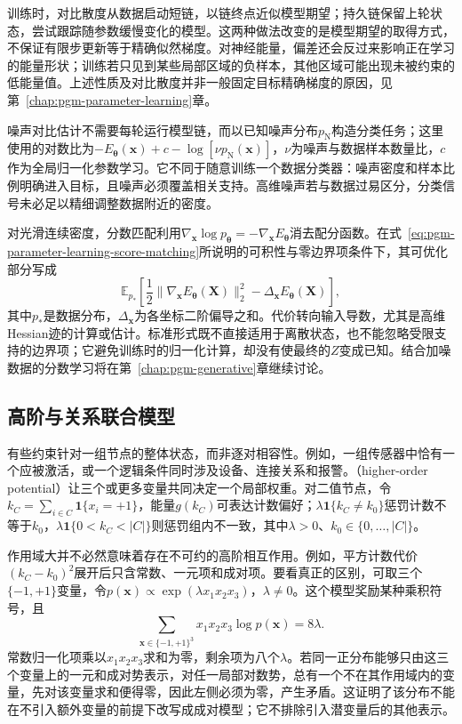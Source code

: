 训练时，对比散度从数据启动短链，以链终点近似模型期望；持久链保留上轮状态，尝试跟踪随参数缓慢变化的模型。这两种做法改变的是模型期望的取得方式，不保证有限步更新等于精确似然梯度。对神经能量，偏差还会反过来影响正在学习的能量形状；训练若只见到某些局部区域的负样本，其他区域可能出现未被约束的低能量值。上述性质及对比散度并非一般固定目标精确梯度的原因，见第~\ref{chap:pgm-parameter-learning}章。

噪声对比估计不需要每轮运行模型链，而以已知噪声分布$p_{\mathrm{N}}$构造分类任务；这里使用的对数比为$-E_{\bm{\theta}}(\bm{x})+c-\log[\nu p_{\mathrm{N}}(\bm{x})]$，$\nu$为噪声与数据样本数量比，$c$作为全局归一化参数学习。它不同于随意训练一个数据分类器：噪声密度和样本比例明确进入目标，且噪声必须覆盖相关支持。高维噪声若与数据过易区分，分类信号未必足以精细调整数据附近的密度。

对光滑连续密度，分数匹配利用$\nabla_{\bm{x}}\log p_{\bm{\theta}}=-\nabla_{\bm{x}}E_{\bm{\theta}}$消去配分函数。在式~\eqref{eq:pgm-parameter-learning-score-matching}所说明的可积性与零边界项条件下，其可优化部分写成
\[
  \mathbb{E}_{p_*}\!\left[
      \frac12\lVert\nabla_{\bm{x}}E_{\bm{\theta}}(\bm{X})\rVert_2^2
      -\Delta_{\bm{x}}E_{\bm{\theta}}(\bm{X})\right],
\]
其中$p_*$是数据分布，$\Delta_{\bm{x}}$为各坐标二阶偏导之和。代价转向输入导数，尤其是高维Hessian迹的计算或估计。标准形式既不直接适用于离散状态，也不能忽略受限支持的边界项；它避免训练时的归一化计算，却没有使最终的$Z$变成已知。结合加噪数据的分数学习将在第~\ref{chap:pgm-generative}章继续讨论。

\subsection{高阶与关系联合模型}
\label{sec:pgm-energy-models-higher-relational}

有些约束针对一组节点的整体状态，而非逐对相容性。例如，一组传感器中恰有一个应被激活，或一个逻辑条件同时涉及设备、连接关系和报警。（higher-order potential）让三个或更多变量共同决定一个局部权重。对二值节点，令$k_C=\sum_{i\in C}\mathbf{1}\{x_i=+1\}$，能量$g(k_C)$可表达计数偏好；$\lambda\mathbf{1}\{k_C\ne k_0\}$惩罚计数不等于$k_0$，$\lambda\mathbf{1}\{0<k_C<|C|\}$则惩罚组内不一致，其中$\lambda>0$、$k_0\in\{0,\ldots,|C|\}$。

作用域大并不必然意味着存在不可约的高阶相互作用。例如，平方计数代价$(k_C-k_0)^2$展开后只含常数、一元项和成对项。要看真正的区别，可取三个$\{-1,+1\}$变量，令$p(\bm{x})\propto\exp(\lambda x_1x_2x_3)$，$\lambda\ne0$。这个模型奖励某种乘积符号，且
\[
  \sum_{\bm{x}\in\{-1,+1\}^3}
     x_1x_2x_3\log p(\bm{x})=8\lambda.
\]
常数归一化项乘以$x_1x_2x_3$求和为零，剩余项为八个$\lambda$。若同一正分布能够只由这三个变量上的一元和成对势表示，对任一局部对数势，总有一个不在其作用域内的变量，先对该变量求和便得零，因此左侧必须为零，产生矛盾。这证明了该分布不能在不引入额外变量的前提下改写成成对模型；它不排除引入潜变量后的其他表示。

